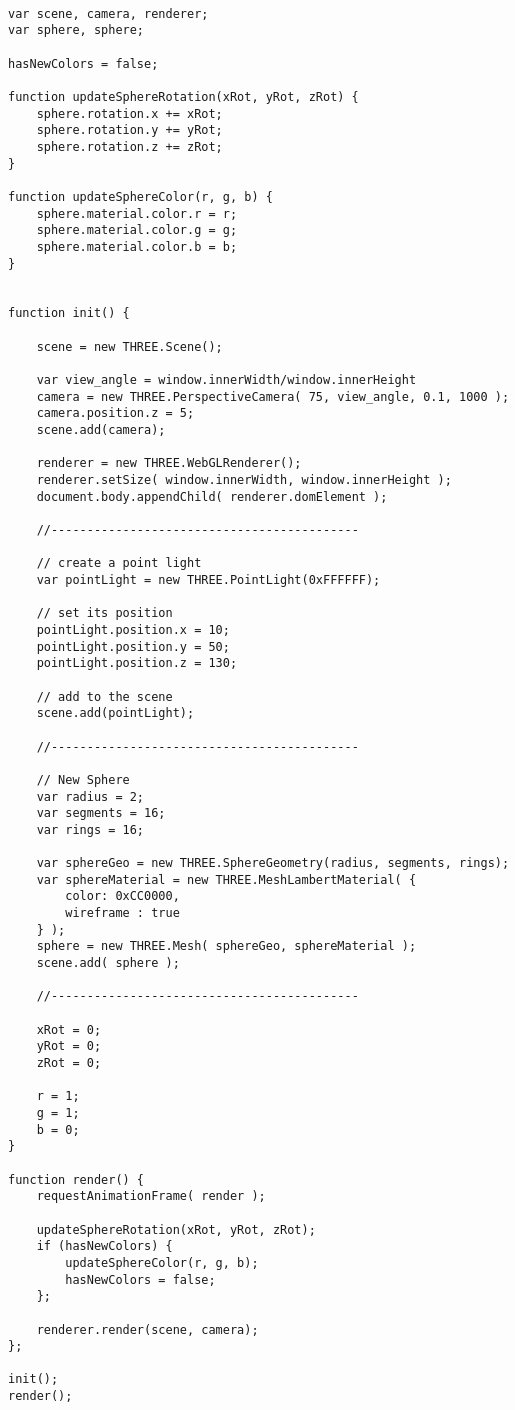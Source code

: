 \documentclass[a4paper,12pt]{article}
\begin{document}
\begin{small}
\begin{Verbatim}[frame=single]

var scene, camera, renderer;
var sphere, sphere;

hasNewColors = false;

function updateSphereRotation(xRot, yRot, zRot) {
    sphere.rotation.x += xRot;
    sphere.rotation.y += yRot;
    sphere.rotation.z += zRot;
}

function updateSphereColor(r, g, b) {
    sphere.material.color.r = r;
    sphere.material.color.g = g;
    sphere.material.color.b = b;
}


function init() {

    scene = new THREE.Scene();

    var view_angle = window.innerWidth/window.innerHeight
    camera = new THREE.PerspectiveCamera( 75, view_angle, 0.1, 1000 );
    camera.position.z = 5;
    scene.add(camera);

    renderer = new THREE.WebGLRenderer();
    renderer.setSize( window.innerWidth, window.innerHeight );
    document.body.appendChild( renderer.domElement );

    //-------------------------------------------

    // create a point light
    var pointLight = new THREE.PointLight(0xFFFFFF);

    // set its position
    pointLight.position.x = 10;
    pointLight.position.y = 50;
    pointLight.position.z = 130;

    // add to the scene
    scene.add(pointLight);

    //-------------------------------------------

    // New Sphere
    var radius = 2;
    var segments = 16;
    var rings = 16;

    var sphereGeo = new THREE.SphereGeometry(radius, segments, rings);
    var sphereMaterial = new THREE.MeshLambertMaterial( {
        color: 0xCC0000,
        wireframe : true
    } );
    sphere = new THREE.Mesh( sphereGeo, sphereMaterial );
    scene.add( sphere );

    //-------------------------------------------

    xRot = 0;
    yRot = 0;
    zRot = 0;

    r = 1;
    g = 1;
    b = 0;
}

function render() {
    requestAnimationFrame( render );

    updateSphereRotation(xRot, yRot, zRot);
    if (hasNewColors) {
        updateSphereColor(r, g, b);
        hasNewColors = false;
    };

    renderer.render(scene, camera);
};

init();
render();
\end{Verbatim}
\end{small}
\end{document}
